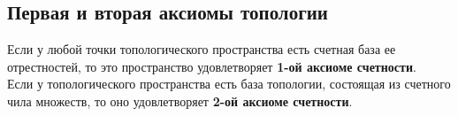 \subsection{Первая и вторая аксиомы топологии}
Если у любой точки топологического пространства есть счетная база
ее отрестностей, то это пространство удовлетворяет \textbf{1-ой аксиоме
счетности}. 
\\
Если у топологического пространства есть база топологии, состоящая
из счетного чила множеств, то оно удовлетворяет \textbf{2-ой аксиоме счетности}.